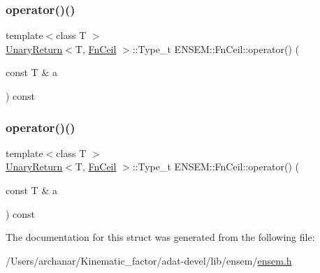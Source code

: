 \mbox{\label{structENSEM_1_1FnCeil_acaee8f3349fe23a961345ed93b8c7bc4}} 
\subsubsection{\texorpdfstring{operator()()}{operator()()}\hspace{0.1cm}{\footnotesize\ttfamily [2/3]}}
{\footnotesize\ttfamily template$<$class T $>$ \\
\mbox{\hyperlink{structENSEM_1_1UnaryReturn}{Unary\+Return}}$<$T, \mbox{\hyperlink{structENSEM_1_1FnCeil}{Fn\+Ceil}} $>$\+::Type\+\_\+t E\+N\+S\+E\+M\+::\+Fn\+Ceil\+::operator() (\begin{DoxyParamCaption}\item[{const T \&}]{a }\end{DoxyParamCaption}) const\hspace{0.3cm}{\ttfamily [inline]}}

\mbox{\label{structENSEM_1_1FnCeil_acaee8f3349fe23a961345ed93b8c7bc4}} 
\subsubsection{\texorpdfstring{operator()()}{operator()()}\hspace{0.1cm}{\footnotesize\ttfamily [3/3]}}
{\footnotesize\ttfamily template$<$class T $>$ \\
\mbox{\hyperlink{structENSEM_1_1UnaryReturn}{Unary\+Return}}$<$T, \mbox{\hyperlink{structENSEM_1_1FnCeil}{Fn\+Ceil}} $>$\+::Type\+\_\+t E\+N\+S\+E\+M\+::\+Fn\+Ceil\+::operator() (\begin{DoxyParamCaption}\item[{const T \&}]{a }\end{DoxyParamCaption}) const\hspace{0.3cm}{\ttfamily [inline]}}



The documentation for this struct was generated from the following file\+:\begin{DoxyCompactItemize}
\item 
/\+Users/archanar/\+Kinematic\+\_\+factor/adat-\/devel/lib/ensem/\mbox{\hyperlink{adat-devel_2lib_2ensem_2ensem_8h}{ensem.\+h}}\end{DoxyCompactItemize}
